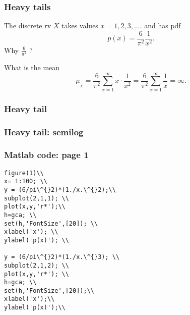 \begin{frame}[fragile]\frametitle{Heavy tails}

The discrete rv $X$ takes values $x=1,2,3,....$ and has
pdf
$$p(x) = \frac{6}{\pi^2} \frac{1}{x^2}.$$ 
Why $\frac{6}{\pi^2}$ ?

What is the mean
$$\mu_{_X} = \frac{6}{\pi^2} \sum_{x=1}^{\infty} x \cdot \frac{1}{x^2}
= \frac{6}{\pi^2} \sum_{x=1}^\infty \frac{1}{x} = \infty.$$ 

\end{frame}



\begin{frame}[fragile]\frametitle{Heavy tail}

\center{\texttt{[image: ht1]} }

\end{frame}


\begin{frame}[fragile]\frametitle{Heavy tail: semilog}

\center{\texttt{[image: ht2]} }

\end{frame}


\begin{frame}[fragile]\frametitle{Matlab code: page 1}

{\tiny

\begin{lstlisting}
figure(1)\\ 
x= 1:100; \\
y = (6/pi\^{}2)*(1./x.\^{}2);\\
subplot(2,1,1); \\
plot(x,y,'r*');\\
h=gca; \\
set(h,'FontSize',[20]); \\
xlabel('x'); \\
ylabel('p(x)'); \\

y = (6/pi\^{}2)*(1./x.\^{}3); \\
subplot(2,1,2); \\
plot(x,y,'r*'); \\
h=gca; \\
set(h,'FontSize',[20]);\\
xlabel('x');\\
ylabel('p(x)');\\
\end{lstlisting}
}

\end{frame}



